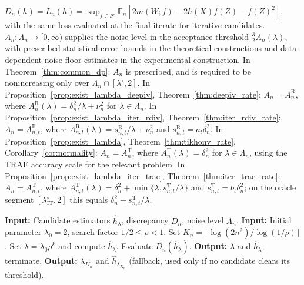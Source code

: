 \documentclass[12pt]{article}
\theoremstyle{plain}
\theoremstyle{definition}
\theoremstyle{remark}
\begin{document}
$D_n(h)=L_n(h)=\sup_{f\in\mathcal F}\mathbb E_n[2m(W;f)-2h(X)f(Z)-f(Z)^2]$, with the same loss evaluated at the final iterate for iterative candidates. $A_n:\Lambda_n\to[0,\infty)$ supplies the noise level in the acceptance threshold $\tfrac32A_n(\lambda)$, with prescribed statistical-error bounds in the theoretical constructions and data-dependent noise-floor estimates in the experimental construction. In Theorem~\ref{thm:common_dp}: $A_n$ is prescribed, and is required to be nonincreasing only over $\Lambda_n\cap[\lambda^\circ,2]$. In Proposition~\ref{prop:exist_lambda_deepiv}, Theorem~\ref{thm:deepiv_rate}: $A_n=A_n^{\mathrm R}$, where $A_n^{\mathrm R}(\lambda)=\delta_n^2/\lambda+\nu_n^2$ for $\lambda\in\Lambda_n$. In Proposition~\ref{prop:exist_lambda_iter_rdiv}, Theorem~\ref{thm:iter_rdiv_rate}: $A_n=A_{n,t}^{\mathrm R}$, where $A_{n,t}^{\mathrm R}(\lambda)=s_{n,t}^{\mathrm R}/\lambda+\nu_n^2$ and $s_{n,t}^{\mathrm R}=a_t\delta_n^2$. In Proposition~\ref{prop:exist_lambda}, Theorem~\ref{thm:tikhonv_rate}, Corollary~\ref{cor:normality}: $A_n=A_n^{\mathrm T}$, where $A_n^{\mathrm T}(\lambda)=\delta_n^2$ for $\lambda\in\Lambda_n$, using the TRAE accuracy scale for the relevant problem. In Proposition~\ref{prop:exist_lambda_iter_trae}, Theorem~\ref{thm:iter_trae_rate}: $A_n=A_{n,t}^{\mathrm T}$, where $A_{n,t}^{\mathrm T}(\lambda)=\delta_n^2+\min\{\lambda,s_{n,t}^{\mathrm T}/\lambda\}$ and $s_{n,t}^{\mathrm T}=b_t\delta_n^2$; on the oracle segment $[\lambda_{\mathrm{IT}}^\circ,2]$ this equals $\delta_n^2+s_{n,t}^{\mathrm T}/\lambda$.


\begin{algorithm}[H]
    \caption{Adaptive Regularization via Discrepancy Principle}
    \label{alg:discrepancy}
    \begin{algorithmic}[1]
        \STATE \textbf{Input:} Candidate estimators $\hat h_\lambda$, discrepancy $D_n$, noise level $A_n$.
        \STATE \textbf{Input:} Initial parameter $\lambda_0=2$, search factor $1/2\leqslant\rho<1$.
        \STATE Set $K_n=\lceil\log(2n^2)/\log(1/\rho)\rceil$.
            \STATE Set $\lambda=\lambda_0\rho^k$ and compute $\hat h_\lambda$.
            \STATE Evaluate $D_n(\hat h_\lambda)$.
                \STATE \textbf{Output:} $\lambda$ and $\hat h_\lambda$; terminate.
            \ENDIF
        \ENDFOR
        \STATE \textbf{Output:} $\lambda_{K_n}$ and $\hat h_{\lambda_{K_n}}$ (fallback, used only if no candidate clears its threshold).
    \end{algorithmic}
\end{algorithm}
\end{document}

